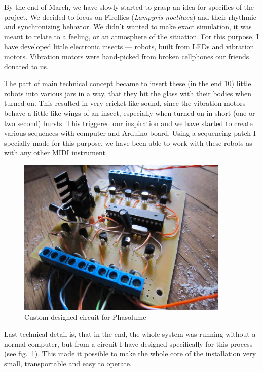 \documentclass[12pt,a4paper,oneside]{report}
\begin{document}
By the end of March, we have slowly started to grasp an idea for specifics of the project. We decided to focus on Fireflies (\emph{Lampyris noctiluca}) and their rhythmic and synchronizing behavior. We didn't wanted to make exact simulation, it was meant to relate to a feeling, or an atmosphere of the situation. For this purpose, I have developed little electronic insects --- robots, built from LEDs and vibration motors. Vibration motors were hand-picked from broken cellphones our friends donated to us. 

The part of main technical concept became to insert these (in the end 10) little robots into various jars in a way, that they hit the glass with their bodies when turned on. This resulted in very cricket-like sound, since the vibration motors behave a little like wings of an insect, especially when turned on in short (one or two second) bursts. This triggered our inspiration and we have started to create various sequences with computer and Arduino board. Using a sequencing patch I specially made for this purpose, we have been able to work with these robots as with any other MIDI instrument.

\begin{figure}  
  \centering
    \includegraphics[width=0.9\textwidth]{img/phasolume}
	\caption{Custom designed circuit for Phasolume}
	\label{fig:phasolume}
\end{figure}

Last technical detail is, that in the end, the whole system was running without a normal computer, but from a circuit I have designed specifically for this process (see fig.~\ref{fig:phasolume}). This made it possible to make the whole core of the installation very small, transportable and easy to operate.
\end{document}
